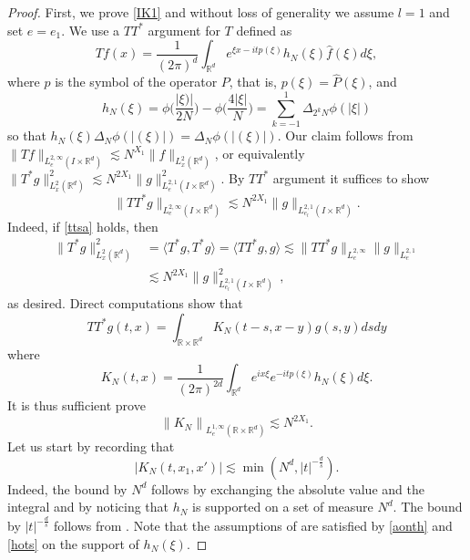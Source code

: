 \documentclass[10pt,leqno]{amsart}
\newcommand{\R}{\mathbb{R}}
\numberwithin{equation}{section}
\begin{document}
\begin{proof}
First, we prove \eqref{IK1} and without loss of generality we assume $l=1$ and set $e = e_1$. We use a \(TT^{*}\) argument for $T$ defined as 
\begin{equation*}
T f(x)=\frac{1}{(2\pi)^{d}} \int_{\R^{d}} e^{\xi x - i t p(\xi)} h_{N}(\xi)\hat{f}(\xi)d \xi,
\end{equation*}
where $p$ is the symbol of the operator $P$, that is, $p(\xi)=\hat{P}(\xi)$, and
\begin{equation*}
h_{N}(\xi)=\phi\Big(\frac{|\xi)|}{2N}\Big)-\phi\Big(\frac{4|\xi|}{N}\Big)=\sum_{k=-1}^{1}\Delta_{2^{k}N}\phi(|\xi|)
\end{equation*}
so that \(h_{N}(\xi)\Delta_{N}\phi(|(\xi)|)=\Delta_{N}\phi(|(\xi)|)\). Our claim follows from \(\|Tf\|_{L_{e}^{2,\infty} (I\times \R^d)}\lesssim N^{X_{1}} \|f\|_{L^{2}_{x}(\R^{d})}\), 
or equivalently \(\|T^{*}g\|_{L^{2}_{x}(\R^{d})}^{2}\lesssim N^{2X_{1}}\|g\|_{L_{e}^{2,1} (I\times \R^d)}^{2}\). By  \(TT^{*}\) argument  it suffices to show 
\begin{equation}\label{ttsa}
\|TT^{*}g\|_{L_{e}^{2,\infty} (I\times \R^d)}\lesssim N^{2X_{1}}\|g\|_{L_{e_l}^{2,1} (I\times \R^d)}.
\end{equation}
Indeed, if \eqref{ttsa} holds, then
\begin{align*}
\|T^{*}g\|_{L^{2}_{x}(\R^{d})}^{2} &= \langle T^{*}g, T^{*}g \rangle = \langle TT^{*}g, g \rangle \lesssim \|TT^{*}g\|_{L^{2, \infty}_{e}} \|g\|_{L_{e}^{2,1}}
\\
&
\lesssim   N^{2X_{1}}\|g\|_{L_{e_l}^{2,1} (I\times \R^d)}^2 \,,
\end{align*}
as desired. 
Direct computations show that
\begin{equation*}
TT^{*}g (t, x)= \int_{\R\times\R^{d}} K_{N}(t-s,x -y) g(s, y)  ds dy
\end{equation*}
where 
\begin{equation*}
 K_{N}(t,x) =\frac{1}{(2\pi)^{2d}}\int_{\R^{d}} e^{i x \xi} e^{-it p (\xi) }  h_{N}(\xi)d\xi.
\end{equation*}
It is thus sufficient prove
$$
\left\| K_{N}\right\|_{L^{1, \infty}_e (\R\times\R^{d})} \lesssim N^{2X_1}.
$$
Let us start by recording that 
$$| K_{N}(t,x_1 ,x')|\lesssim  \min (N^d , |t|^{-\frac{d}{s}}). $$
Indeed, the bound by $N^d$ follows by exchanging the absolute value and the integral and by noticing that \(h_{N}\) is supported on a set of measure \(N^{d}\). The bound by $|t|^{-\frac{d}{s}}$ follows from  \cite[Theorem 3.1]{MR3710698}.  Note that the assumptions of \cite[Theorem 3.1]{MR3710698} are satisfied by \eqref{aonth} and \eqref{hots} on the support of $h_N(\xi)$. 

\end{proof}
\end{document}
